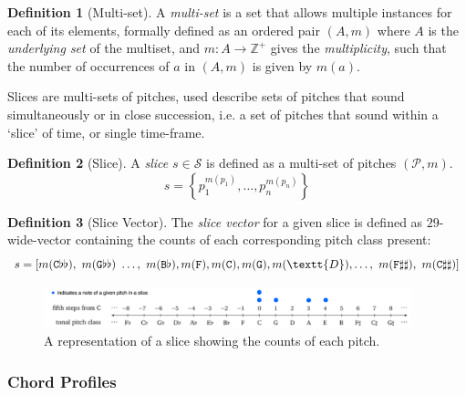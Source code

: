\documentclass[12pt,a4paper,twoside,openany]{report} \usepackage[pdfborder={0 0 0}]{hyperref}    %
\theoremstyle{definition} \newtheorem{definition}{Definition}[section]
\begin{document}
\begin{definition}[Multi-set] A \textit{multi-set} is a set that allows multiple instances for each of its elements,
formally defined as an ordered pair $(A,m)$ where $A$ is the \textit{underlying set} of the multiset, and $m:A \to
\mathbb{Z}^+$ gives the \textit{multiplicity}, such that the number of occurrences of $a$ in $(A,m)$ is given by $m(a)$.
\end{definition}

Slices are multi-sets of pitches, used describe sets of pitches that sound simultaneously or in close succession, i.e. a set of pitches that sound within a `slice' of time, or single time-frame. 

\begin{definition}[Slice] 
  A \textit{slice} $s \in \mathcal{S}$ is defined as a multi-set of pitches $(\mathcal{P}, m)$. 
  \begin{equation} s = \left\{ p_1^{m(p_1)} , \dots, p_n^{m(p_n)} \right\}
  \label{eq:sliceDef} \end{equation}
\end{definition}

\begin{definition}[Slice Vector] 
  The \textit{slice vector} for a given slice is defined as $29$-wide-vector containing the counts of each corresponding pitch class present:
  \begin{equation} s = \left[ m(\texttt{C}\flat\flat) ,~m(\texttt{G}\flat\flat)~\dots,~m(\texttt{B}\flat),m(\texttt{F}),
    m(\texttt{C}), m(\texttt{G}), m(\textt{D}),\dots,~m(\texttt{F}\sharp\sharp),~m(\texttt{C}\sharp\sharp) \right]
  \label{eq:sliceVec} \end{equation}
\end{definition}


\begin{figure}[ht]
  \begin{center}
    \includegraphics[width=0.95\textwidth]{figs/prep/inferringHarmony/sliceRep/cMaj.png}
  \end{center}
  \caption{A representation of a slice showing the counts of each pitch.}
  \label{fig:slices}
\end{figure}

\subsubsection{Chord Profiles}
\label{sub:chordProfiles}
\end{document}
